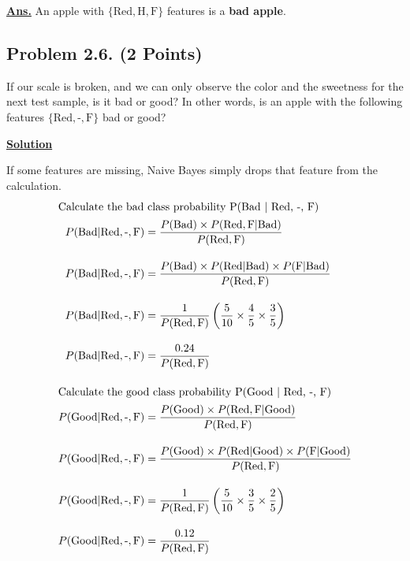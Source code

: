 \documentclass[12pt, a4paper]{article}
\begin{document}
            \noindent \underline{\textbf{Ans.}} An apple with $\{ \text{Red}, \text{H}, \text{F} \}$ features is a \textbf{bad apple}.

    \pagebreak

        \subsection{Problem 2.6. (2 Points)}
            If our scale is broken, and we can only observe the color and the sweetness for the next test sample, is it bad or good?
            In other words, is an apple with the following features $\{ \text{Red}, \text{-}, \text{F} \}$ bad or good?

            \vspace{1em}

            \noindent \underline{\textbf{Solution}}

            \vspace{0.5em}

            If some features are missing, Naive Bayes simply drops that feature from the calculation.
            \begin{align*}
                \intertext{Calculate the bad class probability P(\text{Bad} | \text{Red}, \text{-}, \text{F})}
                P(\text{Bad} | \text{Red}, \text{-}, \text{F}) &= \frac{P(\text{Bad}) \times P(\text{Red}, \text{F} | \text{Bad})}{P(\text{Red}, \text{F})} \\[1em]
                P(\text{Bad} | \text{Red}, \text{-}, \text{F}) &= \frac{P(\text{Bad}) \times P(\text{Red} | \text{Bad}) \times P(\text{F} | \text{Bad})}{P(\text{Red}, \text{F})} \\[1em]
                P(\text{Bad} | \text{Red}, \text{-}, \text{F}) &= \frac{1}{P(\text{Red}, \text{F})} \left( \frac{5}{10} \times \frac{4}{5} \times \frac{3}{5} \right) \\[1em]
                P(\text{Bad} | \text{Red}, \text{-}, \text{F}) &= \frac{0.24}{P(\text{Red}, \text{F})} \\[1em]
                \intertext{Calculate the good class probability P(\text{Good} | \text{Red}, \text{-}, \text{F})}
                P(\text{Good} | \text{Red}, \text{-}, \text{F}) &= \frac{P(\text{Good}) \times P(\text{Red}, \text{F} | \text{Good})}{P(\text{Red}, \text{F})} \\[1em]
                P(\text{Good} | \text{Red}, \text{-}, \text{F}) &= \frac{P(\text{Good}) \times P(\text{Red} | \text{Good}) \times P(\text{F} | \text{Good})}{P(\text{Red}, \text{F})} \\[1em]
                P(\text{Good} | \text{Red}, \text{-}, \text{F}) &= \frac{1}{P(\text{Red}, \text{F})} \left( \frac{5}{10} \times \frac{3}{5} \times \frac{2}{5} \right) \\[1em]
                P(\text{Good} | \text{Red}, \text{-}, \text{F}) &= \frac{0.12}{P(\text{Red}, \text{F})}
            \end{align*}
\end{document}
